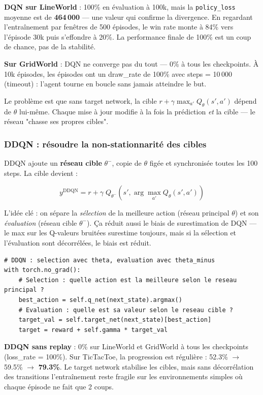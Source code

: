 \documentclass[12pt,a4paper]{article}
\begin{document}
\begin{observationbox}
\textbf{DQN sur LineWorld} : 100\% en évaluation à 100k, mais la \texttt{policy\_loss} moyenne est de \textbf{464\,000} — une valeur qui confirme la divergence. En regardant l'entraînement par fenêtres de 500 épisodes, le win rate monte à 84\% vers l'épisode 30k puis s'effondre à 20\%. La performance finale de 100\% est un coup de chance, pas de la stabilité.

\textbf{Sur GridWorld} : DQN ne converge pas du tout — 0\% à tous les checkpoints. À 10k épisodes, les épisodes ont un draw\_rate de 100\% avec steps = 10\,000 (timeout) : l'agent tourne en boucle sans jamais atteindre le but.
\end{observationbox}

Le problème est que sans target network, la cible $r + \gamma \max_{a'} Q_\theta(s', a')$ dépend de $\theta$ lui-même. Chaque mise à jour modifie à la fois la prédiction \emph{et} la cible — le réseau "chasse ses propres cibles".

\subsubsection{DDQN : résoudre la non-stationnarité des cibles}

DDQN ajoute un \textbf{réseau cible} $\theta^-$, copie de $\theta$ figée et synchronisée toutes les 100 steps. La cible devient :

\[
y^{\text{DDQN}} = r + \gamma\; Q_{\theta^-}\!\left(s', \arg\max_{a'} Q_\theta(s', a')\right)
\]

L'idée clé : on sépare la \emph{sélection} de la meilleure action (réseau principal $\theta$) et son \emph{évaluation} (réseau cible $\theta^-$). Ça réduit aussi le biais de surestimation de DQN — le max sur les Q-valeurs bruitées surestime toujours, mais si la sélection et l'évaluation sont décorrélées, le biais est réduit.

\begin{lstlisting}
# DDQN : selection avec theta, evaluation avec theta_minus
with torch.no_grad():
    # Selection : quelle action est la meilleure selon le reseau principal ?
    best_action = self.q_net(next_state).argmax()
    # Evaluation : quelle est sa valeur selon le reseau cible ?
    target_val = self.target_net(next_state)[best_action]
    target = reward + self.gamma * target_val
\end{lstlisting}

\begin{observationbox}
\textbf{DDQN sans replay} : 0\% sur LineWorld et GridWorld à tous les checkpoints (loss\_rate = 100\%). Sur TicTacToe, la progression est régulière : 52.3\% $\to$ 59.5\% $\to$ \textbf{79.3\%}. Le target network stabilise les cibles, mais sans décorrélation des transitions l'entraînement reste fragile sur les environnements simples où chaque épisode ne fait que 2 coups.
\end{observationbox}
\end{document}
